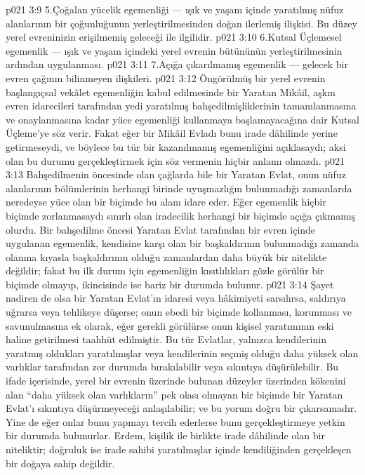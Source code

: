 \vs p021 3:9 5.\bibnobreakspace Çoğalan yücelik egemenliği --- ışık ve yaşam içinde yaratılmış nüfuz alanlarının bir çoğunluğunun yerleştirilmesinden doğan ilerlemiş ilişkisi. Bu düzey yerel evreninizin erişilmemiş geleceği ile ilgilidir.
\vs p021 3:10 6.\bibnobreakspace Kutsal Üçlemesel egemenlik --- ışık ve yaşam içindeki yerel evrenin bütününün yerleştirilmesinin ardından uygulanması.
\vs p021 3:11 7.\bibnobreakspace Açığa çıkarılmamış egemenlik --- gelecek bir evren çağının bilinmeyen ilişkileri.
\vs p021 3:12 Öngörülmüş bir yerel evrenin başlangıçsal vekâlet egemenliğin kabul edilmesinde bir Yaratan Mikâil, aşkın evren idarecileri tarafından yedi yaratılmış bahşedilmişliklerinin tamamlanmasına ve onaylanmasına kadar yüce egemenliği kullanmaya başlamayacağına dair Kutsal Üçleme’ye söz verir. Fakat eğer bir Mikâil Evladı bunu irade dâhilinde yerine getirmeseydi, ve böylece bu tür bir kazanılmamış egemenliğini açıklasaydı; aksi olan bu durumu gerçekleştirmek için söz vermenin hiçbir anlamı olmazdı.
\vs p021 3:13 Bahşedilmenin öncesinde olan çağlarda bile bir Yaratan Evlat, onun nüfuz alanlarının bölümlerinin herhangi birinde uyuşmazlığın bulunmadığı zamanlarda neredeyse yüce olan bir biçimde bu alanı idare eder. Eğer egemenlik hiçbir biçimde zorlanmasaydı sınırlı olan iradecilik herhangi bir biçimde açığa çıkmamış olurdu. Bir bahşedilme öncesi Yaratan Evlat tarafından bir evren içinde uygulanan egemenlik, kendisine karşı olan bir başkaldırının bulunmadığı zamanda olanına kıyasla başkaldırının olduğu zamanlardan daha büyük bir nitelikte değildir; fakat bu ilk durum için egemenliğin kısıtlılıkları gözle görülür bir biçimde olmayıp, ikincisinde ise bariz bir durumda bulunur.
\vs p021 3:14 Şayet nadiren de olsa bir Yaratan Evlat’ın idaresi veya hâkimiyeti sarsılırsa, saldırıya uğrarsa veya tehlikeye düşerse; onun ebedi bir biçimde kollanması, korunması ve savunulmasına ek olarak, eğer gerekli görülürse onun kişisel yaratımının eski haline getirilmesi taahhüt edilmiştir. Bu tür Evlatlar, yalnızca kendilerinin yaratmış oldukları yaratılmışlar veya kendilerinin seçmiş olduğu daha yüksek olan varlıklar tarafından zor durumda bırakılabilir veya sıkıntıya düşürülebilir. Bu ifade içerisinde, yerel bir evrenin üzerinde bulunan düzeyler üzerinden kökenini alan “daha yüksek olan varlıkların” pek olası olmayan bir biçimde bir Yaratan Evlat’ı sıkıntıya düşürmeyeceği anlaşılabilir; ve bu yorum doğru bir çıkarsamadır. Yine de eğer onlar bunu yapmayı tercih ederlerse bunu gerçekleştirmeye yetkin bir durumda bulunurlar. Erdem, kişilik ile birlikte irade dâhilinde olan bir niteliktir; doğruluk ise irade sahibi yaratılmışlar içinde kendiliğinden gerçekleşen bir doğaya sahip değildir.
